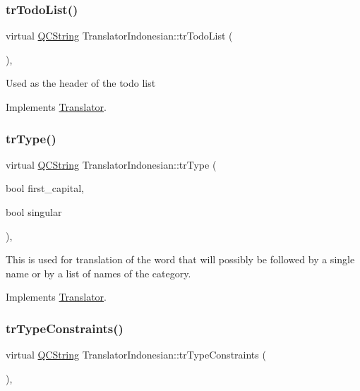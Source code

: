 \subsubsection{\texorpdfstring{trTodoList()}{trTodoList()}}
{\footnotesize\ttfamily virtual \mbox{\hyperlink{class_q_c_string}{Q\+C\+String}} Translator\+Indonesian\+::tr\+Todo\+List (\begin{DoxyParamCaption}{ }\end{DoxyParamCaption})\hspace{0.3cm}{\ttfamily [inline]}, {\ttfamily [virtual]}}

Used as the header of the todo list 

Implements \mbox{\hyperlink{class_translator}{Translator}}.

\mbox{\label{class_translator_indonesian_a284a628bd14f0842ed627cab396c23b6}} 
\subsubsection{\texorpdfstring{trType()}{trType()}}
{\footnotesize\ttfamily virtual \mbox{\hyperlink{class_q_c_string}{Q\+C\+String}} Translator\+Indonesian\+::tr\+Type (\begin{DoxyParamCaption}\item[{bool}]{first\+\_\+capital,  }\item[{bool}]{singular }\end{DoxyParamCaption})\hspace{0.3cm}{\ttfamily [inline]}, {\ttfamily [virtual]}}

This is used for translation of the word that will possibly be followed by a single name or by a list of names of the category. 

Implements \mbox{\hyperlink{class_translator}{Translator}}.

\mbox{\label{class_translator_indonesian_a19d5cd196c0711e4ecc84da498a4aecc}} 
\subsubsection{\texorpdfstring{trTypeConstraints()}{trTypeConstraints()}}
{\footnotesize\ttfamily virtual \mbox{\hyperlink{class_q_c_string}{Q\+C\+String}} Translator\+Indonesian\+::tr\+Type\+Constraints (\begin{DoxyParamCaption}{ }\end{DoxyParamCaption})\hspace{0.3cm}{\ttfamily [inline]}, {\ttfamily [virtual]}}


